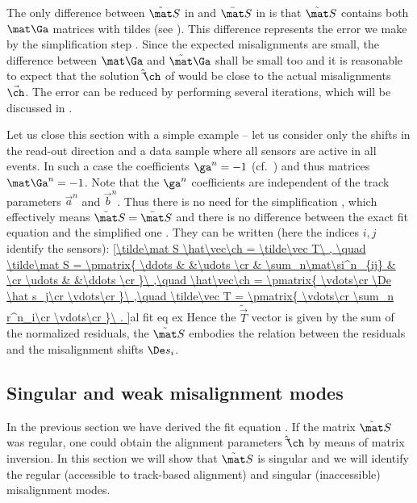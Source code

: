 The only difference between $\tilde\mat S$ in  and $\bar\mat S$ in  is that $\tilde\mat S$ contains both $\mat\Ga$ matrices with tildes (see ). This difference represents the error we make by the simplification step . Since the expected misalignments are small, the difference between $\mat\Ga$ and $\tilde\mat\Ga$ shall be small too and it is reasonable to expect that the solution $\hat\vec\ch$ of  would be close to the actual misalignments $\vec\ch$. The error can be reduced by performing several iterations, which will be discussed in .

Let us close this section with a simple example -- let us consider only the shifts in the read-out direction and a data sample where all sensors are active in all events. In such a case the coefficients $\ga^n = -1$ (cf.~) and thus matrices $\mat\Ga^n = -1$. Note that the $\ga^n$ coefficients are independent of the track parameters $\vec a^n$ and $\vec b^n$. Thus there is no need for the simplification , which effectively means $\tilde\mat S = \bar\mat S$ and there is no difference between the exact fit equation  and the simplified one . They can be written (here the indices $i,j$ identify the sensors):
\eqref{\tilde\mat S \hat\vec\ch = \tilde\vec T\ , \quad
	\tilde\mat S = \pmatrix{
		\ddots	&						&\udots	\cr
				& \sum_n\mat\si^n_{ij}	&		\cr
		\udots	&						&\ddots	\cr
	}\ ,\quad
	\hat\vec\ch = \pmatrix{
		\vdots\cr
		\De \hat s_j\cr
		\vdots\cr
	}\ ,\quad
	\tilde\vec T = \pmatrix{
		\vdots\cr
		\sum_n r^n_i\cr
		\vdots\cr
	}\ .
}{al fit eq ex}
Hence the $\tilde\vec T$ vector is given by the sum of the normalized residuals, the $\tilde\mat S$ embodies the relation between the residuals and the misalignment shifts $\De s_i$.

\subsection[al sing modes]{Singular and weak misalignment modes}

In the previous section we have derived the fit equation . If the matrix $\tilde\mat S$ was regular, one could obtain the alignment parameters $\hat\vec\ch$ by means of matrix inversion. In this section we will show that $\tilde\mat S$ is singular and we will identify the regular (accessible to track-based alignment) and singular (inaccessible) misalignment modes.

